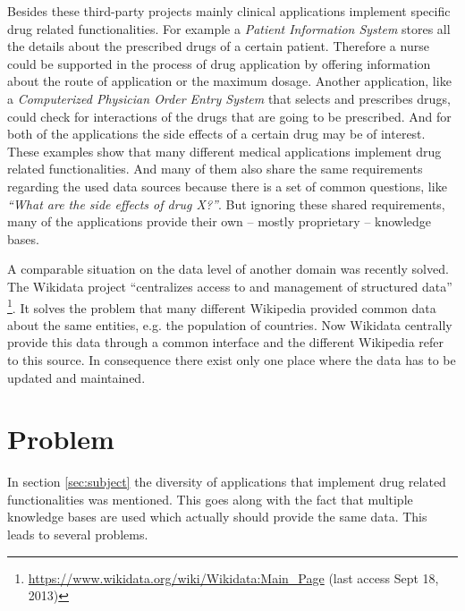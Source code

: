 Besides these third-party projects mainly clinical applications implement specific drug related functionalities.
For example a \textit{Patient Information System} stores all the details about the prescribed drugs of a certain patient.
Therefore a nurse could be supported in the process of drug application by offering information about the route of application or the maximum dosage.
Another application, like a \textit{Computerized Physician Order Entry System} that selects and prescribes drugs, could check for interactions of the drugs that are going to be prescribed.
And for both of the applications the side effects of a certain drug may be of interest.
These examples show that many different medical applications implement drug related functionalities.
And many of them also share the same requirements regarding the used data sources because there is a set of common questions, like \textit{``What are the side effects of drug X?''}.
But ignoring these shared requirements, many of the applications provide their own -- mostly proprietary -- knowledge bases.

A comparable situation on the data level of another domain was recently solved.
The Wikidata project ``centralizes access to and management of structured data'' \footnote{\url{https://www.wikidata.org/wiki/Wikidata:Main_Page} (last access Sept 18, 2013)}.
It solves the problem that many different Wikipedia provided common data about the same entities, e.g. the population of countries.
Now Wikidata centrally provide this data through a common interface and the different Wikipedia refer to this source.
In consequence there exist only one place where the data has to be updated and maintained.



\section{Problem}
\label{sec:problem}

In section \ref{sec:subject} the diversity of applications that implement drug related functionalities was mentioned.
This goes along with the fact that multiple knowledge bases are used which actually should provide the same data. 
This leads to several problems.

